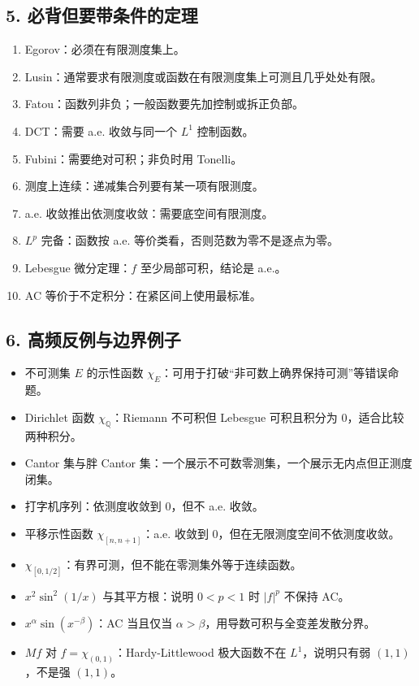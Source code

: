 \documentclass[
UTF8]{ctexart}
\providecommand{\tightlist}{%
\setlength{\itemsep}{0pt}\setlength{\parskip}{0pt}}
\begin{document}
\subsection{5.
必背但要带条件的定理}\label{ux5fc5ux80ccux4f46ux8981ux5e26ux6761ux4ef6ux7684ux5b9aux7406}

\begin{enumerate}
    \def\labelenumi{\arabic{enumi}.}
    \tightlist
  \item
    Egorov：必须在有限测度集上。
  \item
    Lusin：通常要求有限测度或函数在有限测度集上可测且几乎处处有限。
  \item
    Fatou：函数列非负；一般函数要先加控制或拆正负部。
  \item
    DCT：需要 a.e. 收敛与同一个 \(L^1\) 控制函数。
  \item
    Fubini：需要绝对可积；非负时用 Tonelli。
  \item
    测度上连续：递减集合列要有某一项有限测度。
  \item
    a.e. 收敛推出依测度收敛：需要底空间有限测度。
  \item
    \(L^p\) 完备：函数按 a.e. 等价类看，否则范数为零不是逐点为零。
  \item
    Lebesgue 微分定理：\(f\) 至少局部可积，结论是 a.e.。
  \item
    AC 等价于不定积分：在紧区间上使用最标准。
\end{enumerate}

\subsection{6.
高频反例与边界例子}\label{ux9ad8ux9891ux53cdux4f8bux4e0eux8fb9ux754cux4f8bux5b50}

\begin{itemize}
    \tightlist
  \item
    不可测集 \(E\) 的示性函数
    \(\chi_E\)：可用于打破``非可数上确界保持可测''等错误命题。
  \item
    Dirichlet 函数 \(\chi_{\mathbb Q}\)：Riemann 不可积但 Lebesgue
    可积且积分为 \(0\)，适合比较两种积分。
  \item
    Cantor 集与胖 Cantor
    集：一个展示不可数零测集，一个展示无内点但正测度闭集。
  \item
    打字机序列：依测度收敛到 \(0\)，但不 a.e. 收敛。
  \item
    平移示性函数 \(\chi_{[n,n+1]}\)：a.e. 收敛到
    \(0\)，但在无限测度空间不依测度收敛。
  \item
    \(\chi_{[0,1/2]}\)：有界可测，但不能在零测集外等于连续函数。
  \item
    \(x^2\sin^2(1/x)\) 与其平方根：说明 \(0<p<1\) 时 \(|f|^p\) 不保持 AC。
  \item
    \(x^\alpha\sin(x^{-\beta})\)：AC 当且仅当
    \(\alpha>\beta\)，用导数可积与全变差发散分界。
  \item
    \(Mf\) 对 \(f=\chi_{(0,1)}\)：Hardy-Littlewood 极大函数不在
    \(L^1\)，说明只有弱 \((1,1)\)，不是强 \((1,1)\)。
\end{itemize}
\end{document}
